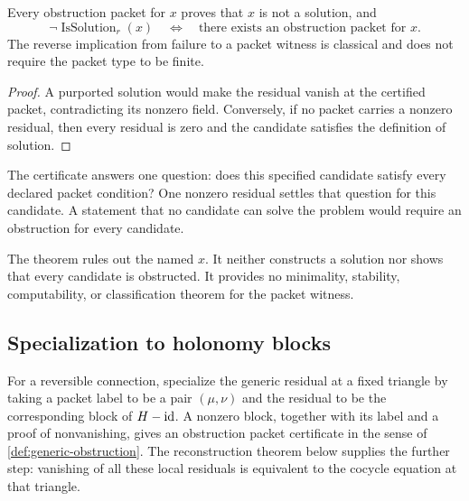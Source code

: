\begin{theorem}
\label{thm:generic-obstruction}
Every obstruction packet for $x$ proves that $x$ is not a solution, and
\[
\neg\operatorname{IsSolution}_r(x)
\quad\Longleftrightarrow\quad
\text{there exists an obstruction packet for }x.
\]
The reverse implication from failure to a packet witness is classical and
does not require the packet type to be finite.
\end{theorem}

\begin{proof}
A purported solution would make the residual vanish at the certified packet,
contradicting its nonzero field.  Conversely, if no packet carries a nonzero
residual, then every residual is zero and the candidate satisfies the
definition of solution.
\end{proof}

\begin{interpretation}[title={What one obstruction certifies}]
The certificate answers one question: does this specified candidate satisfy
every declared packet condition?  One nonzero residual settles that question
for this candidate.  A statement that no candidate can solve the problem
would require an obstruction for every candidate.
\end{interpretation}

\begin{boundary}
The theorem rules out the named $x$.  It neither constructs a solution nor
shows that every candidate is obstructed.  It provides no minimality,
stability, computability, or classification theorem for the packet witness.
\end{boundary}

\subsection{Specialization to holonomy blocks}

For a reversible connection, specialize the generic residual at a fixed
triangle by taking a packet label to be a pair $(\mu,\nu)$ and the residual
to be the corresponding block of $H-\operatorname{id}$.  A nonzero block, together with its
label and a proof of nonvanishing, gives an obstruction packet certificate
in the sense of \cref{def:generic-obstruction}.  The reconstruction theorem
below supplies the further step: vanishing of all these local residuals is
equivalent to the cocycle equation at that triangle.

